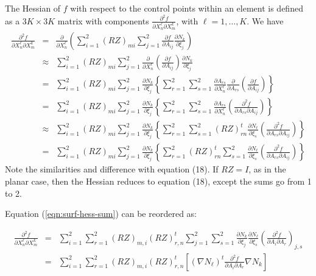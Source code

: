 \documentclass{report}
\begin{document}
 \newline
The Hessian of $f$ with respect to the control points within an element is 
defined as a $3K \times 3K$ matrix with components $\frac{\partial^2 f}{\partial X_n^\ell \partial X_m^k}$, with $\ell=1,\ldots,K$.  We have
\begin{eqnarray}
\frac{\partial^2 f}{\partial X_n^\ell \partial X_m^k} & = & \frac{\partial}{\partial X_n^\ell} \left( \sum_{i=1}^2  \left( RZ \right)_{mi} \sum_{j=1}^2 \frac{\partial f}{\partial A_{ij}} \frac{\partial N_k}{\partial \xi_j} \right) \nonumber \\
& \approx &\sum_{i=1}^2 \left( RZ \right)_{mi} \sum_{j=1}^2  \frac{\partial}{\partial X_n^\ell}  \left( \frac{\partial f}{\partial A_{ij}} \right) \frac{\partial N_k}{\partial \xi_j} \nonumber \\
& = & \sum_{i=1}^2  \left( RZ \right)_{mi} \sum_{j=1}^2  \frac{\partial N_k}{\partial \xi_j} \left\{ \sum_{r=1}^2 \sum_{s=1}^2 \frac{\partial A_{rs}}{\partial X_{n}^\ell} \frac{\partial}{\partial A_{rs}}  \left(  \frac{\partial f}{\partial A_{ij}}  \right) \right\}  \nonumber \\
& = & \sum_{i=1}^2  \left( RZ \right)_{mi} \sum_{j=1}^2  \frac{\partial N_k}{\partial \xi_j} \left\{ \sum_{r=1}^2 \sum_{s=1}^2 \frac{\partial A_{rs}}{\partial X_{n}^\ell} \left(  \frac{\partial^2 f}{\partial A_{rs} \partial A_{ij}}  \right) \right\}  \nonumber \\
& \approx & \sum_{i=1}^2  \left( RZ \right)_{mi} \sum_{j=1}^2 \frac{\partial N_k}{\partial \xi_j} \left\{ \sum_{r=1}^2 \sum_{s=1}^2 \left( RZ \right)_{rn}^t \frac{\partial N_\ell}{\partial \xi_s} \left( \frac{\partial^2 f}{\partial A_{rs} \partial A_{ij}}  \right)  \right\}  \nonumber \\
& = & \label{eqn:surf-hess-sum} \sum_{i=1}^2  \left( RZ \right)_{mi} \sum_{j=1}^2 \frac{\partial N_k}{\partial \xi_j} \left\{ \sum_{r=1}^2  \left( RZ \right)_{rn}^t \sum_{s=1}^2 \frac{\partial N_\ell}{\partial \xi_s} \left( \frac{\partial^2 f}{\partial A_{rs} \partial A_{ij}}  \right)  \right\} 
\end{eqnarray}
Note the similarities and difference with equation (18). If 
$RZ = I$, as in the planar case, then the Hessian reduces to equation (18),
except the sums go from 1 to 2.\newline

\noindent Equation (\ref{eqn:surf-hess-sum}) can be reordered as:

\begin{eqnarray}
\frac{\partial^2 f}{\partial X_n^\ell \partial X_m^k} 
&=& \sum_{i=1}^2 \sum_{r=1}^2 (RZ)_{m,i} (RZ)^t_{r,n}
    \sum_{j=1}^2 \sum_{s=1}^2 \frac{\partial N_k}{\partial \xi_j}
    \frac{\partial N_\ell}{\partial \xi_s}
    \left( \frac{\partial^2 f}{\partial A_i \partial A_r} \right)_{j,s} 
    \nonumber \\
&=& \label{eqn:surf-hess-summat} 
    \sum_{i=1}^2 \sum_{r=1}^2 (RZ)_{m,i} (RZ)^t_{r,n} 
    \left[ (\nabla N_\ell)^t \frac{\partial^2 f}{\partial A_i \partial A_r}
            \nabla N_k \right] 
\end{eqnarray}
\end{document}

